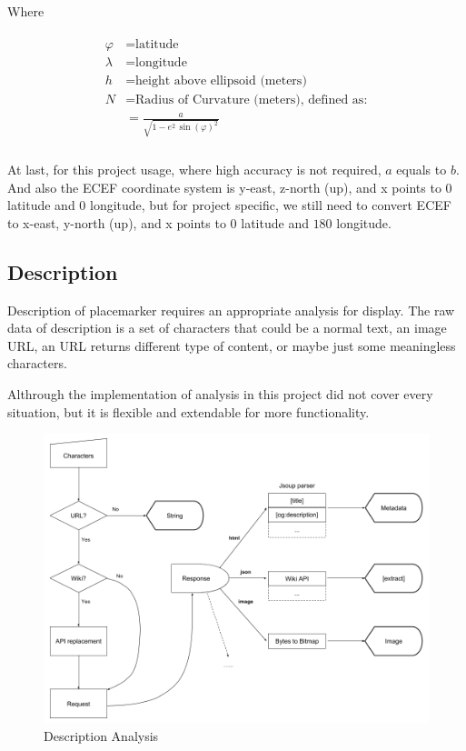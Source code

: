 Where

\[
\begin{array}{lr}
\begin{aligned}
\varphi &= \text{latitude}\\
\lambda &= \text{longitude}\\
h &= \text{height above ellipsoid (meters)}\\
N &= \text{Radius of Curvature (meters), defined as:}\\
&= \frac{a}{\sqrt{1 - e^2\,\sin(\varphi)^2}}\\
\end{aligned}
\end{array}
\]

At last, for this project usage, where high accuracy is not required, $a$ equals to $b$. And also the ECEF coordinate system is y-east, z-north (up), and x points to $0$ latitude and $0$ longitude, but for project specific, we still need to convert ECEF to x-east, y-north (up), and x points to $0$ latitude and $180$ longitude.

\subsection{Description}

Description of placemarker requires an appropriate analysis for display. The raw data of description is a set of characters that could be a normal text, an image URL, an URL returns different type of content, or maybe just some meaningless characters.

Althrough the implementation of analysis in this project did not cover every situation, but it is flexible and extendable for more functionality.

\begin{figure}[H]
\caption[description-analysis]{Description Analysis}
\label{fig:description-analysis}
\centering
\includegraphics[width=\linewidth]{Figures/description-analysis.png}
\decoRule
\end{figure}

